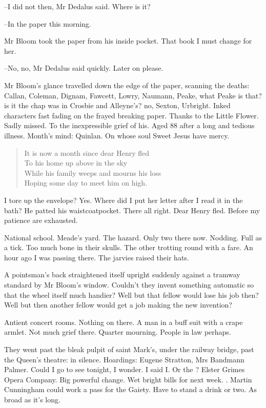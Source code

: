 --I did not then,
Mr Dedalus said.
Where is it?

--In the paper this morning.

Mr Bloom took the paper from his inside pocket.
That book I must change for her.

--No, no,
Mr Dedalus said quickly.
Later on please.

Mr Bloom's glance travelled down the edge of the paper,
scanning the deaths:
Callan, Coleman, Dignam, Fawcett, Lowry, Naumann,
Peake, what Peake is that?
is it the chap was in Crosbie and Alleyne's?
no, Sexton, Urbright.
Inked characters fast fading on the frayed breaking paper.
Thanks to the Little Flower.
Sadly missed.
To the inexpressible grief of his.
Aged 88 after a long and tedious illness.
Month's mind:
Quinlan.
On whose soul Sweet Jesus have mercy.


\begin{verse}
    It is now a month since dear Henry fled \\
    To his home up above in the sky \\
    While his family weeps and mourns his loss \\
    Hoping some day to meet him on high.
\end{verse}


I tore up the envelope?
Yes.
Where did I put her letter after I read it in the bath?
He patted his waistcoatpocket.
There all right.
Dear Henry fled.
Before my patience are exhausted.

National school.
Meade's yard.
The hazard.
Only two there now.
Nodding.
Full as a tick.
Too much bone in their skulls.
The other trotting round with a fare.
An hour ago I was passing there.
The jarvies raised their hats.

A pointsman's back straightened itself upright
suddenly against a tramway standard
by Mr Bloom's window.
Couldn't they invent something automatic so that the wheel itself much handier?
Well but that fellow would lose his job then?
Well but then another fellow would get a job making the new invention?

Antient concert rooms.
Nothing on there.
A man in a buff suit with a crape armlet.
Not much grief there.
Quarter mourning.
People in law perhaps.

They went past the bleak pulpit of saint Mark's,
under the railway bridge,
past the Queen's theatre:
in silence.
Hoardings:
Eugene Stratton,
Mrs Bandmann Palmer.
Could I go to see  tonight, I wonder.
I said I.
Or the ?
Elster Grimes Opera Company.
Big powerful change.
Wet bright bills for next week.
.
Martin Cunningham could work a pass for the Gaiety.
Have to stand a drink or two.
As broad as it's long.

